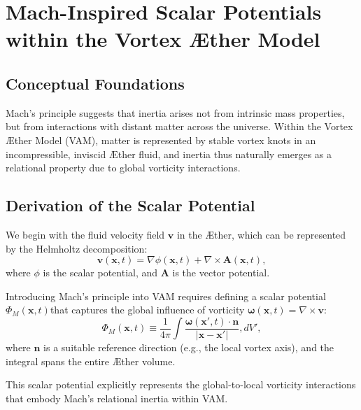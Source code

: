 

\section{Mach-Inspired Scalar Potentials within the Vortex Æther Model}


\subsection{Conceptual Foundations}
Mach's principle suggests that inertia arises not from intrinsic mass properties, but from interactions with distant matter across the universe. Within the Vortex Æther Model (VAM), matter is represented by stable vortex knots in an incompressible, inviscid Æther fluid, and inertia thus naturally emerges as a relational property due to global vorticity interactions.


\subsection{Derivation of the Scalar Potential}
We begin with the fluid velocity field $\mathbf{v}$ in the Æther, which can be represented by the Helmholtz decomposition:
\begin{equation}
    \mathbf{v}(\mathbf{x}, t) = \nabla \phi(\mathbf{x}, t) + \nabla \times \mathbf{A}(\mathbf{x}, t),
\end{equation}
where $\phi$ is the scalar potential, and $\mathbf{A}$ is the vector potential.


Introducing Mach's principle into VAM requires defining a scalar potential $\Phi_M(\mathbf{x},t) $that captures the global influence of vorticity $\boldsymbol{\omega}(\mathbf{x},t)=\nabla \times \mathbf{v}$:
\begin{equation}
    \Phi_M(\mathbf{x}, t) \equiv \frac{1}{4\pi} \int \frac{\boldsymbol{\omega}(\mathbf{x}',t)\cdot\mathbf{n}}{|\mathbf{x}-\mathbf{x}'|}, dV',
\end{equation}
where $\mathbf{n}$ is a suitable reference direction (e.g., the local vortex axis), and the integral spans the entire Æther volume.


This scalar potential explicitly represents the global-to-local vorticity interactions that embody Mach's relational inertia within VAM.



